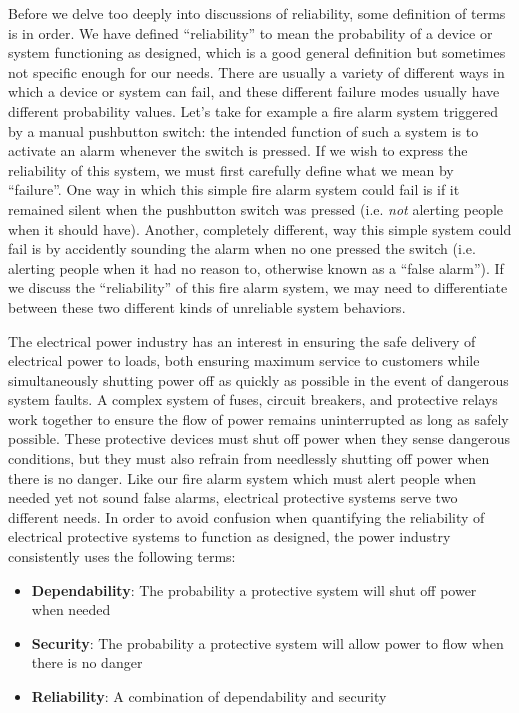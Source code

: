 \vskip 10pt

Before we delve too deeply into discussions of reliability, some definition of terms is in order.  We have defined ``reliability'' to mean the probability of a device or system functioning as designed, which is a good general definition but sometimes not specific enough for our needs.  There are usually a variety of different ways in which a device or system can fail, and these different failure modes usually have different probability values.  Let's take for example a fire alarm system triggered by a manual pushbutton switch: the intended function of such a system is to activate an alarm whenever the switch is pressed.  If we wish to express the reliability of this system, we must first carefully define what we mean by ``failure''.  One way in which this simple fire alarm system could fail is if it remained silent when the pushbutton switch was pressed (i.e. \textit{not} alerting people when it should have).  Another, completely different, way this simple system could fail is by accidently sounding the alarm when no one pressed the switch (i.e. alerting people when it had no reason to, otherwise known as a ``false alarm'').  If we discuss the ``reliability'' of this fire alarm system, we may need to differentiate between these two different kinds of unreliable system behaviors.

The electrical power industry has an interest in ensuring the safe delivery of electrical power to loads, both ensuring maximum service to customers while simultaneously shutting power off as quickly as possible in the event of dangerous system faults.  A complex system of fuses, circuit breakers, and protective relays work together to ensure the flow of power remains uninterrupted as long as safely possible.  These protective devices must shut off power when they sense dangerous conditions, but they must also refrain from needlessly shutting off power when there is no danger.  Like our fire alarm system which must alert people when needed yet not sound false alarms, electrical protective systems serve two different needs.   In order to avoid confusion when quantifying the reliability of electrical protective systems to function as designed, the power industry consistently uses the following terms:

\begin{itemize}
\item \textbf{Dependability}: The probability a protective system will shut off power when needed
\item \textbf{Security}: The probability a protective system will allow power to flow when there is no danger
\item \textbf{Reliability}: A combination of dependability and security
\end{itemize}    

